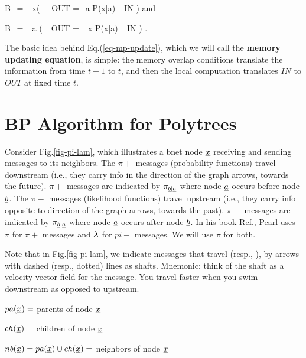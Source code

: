 \beq
B_\pi=
\prod_{x}\indi\left(
_
{OUT}
=\sum_a P(x|a)
_{IN}
\right)
\eeq
and

\beq
B_\pi=
\prod_{a}
\indi\left(
_{OUT}
=
\sum_x P(x|a)
_{IN}
\right)
\;.
\eeq

The basic idea behind Eq.(\ref{eq-mp-update}),
which we will call the
{\bf memory updating equation}, is simple:
the memory overlap conditions translate the information
from time $t-1$ to $t$, and
then the local computation translates
$IN$ to $OUT$ at fixed time $t$.




\section{BP Algorithm for Polytrees}


Consider Fig.\ref{fig-pi-lam},
which illustrates
a bnet node $\rvx$ receiving and sending
messages to its neighbors.
The $\pi+$  messages
(probability functions)
travel downstream (i.e.,
they carry info
in the direction
of the graph arrows, towards the future).
$\pi+$ messages are indicated by
$\pi_{\rvb|\rva}$ where node $\rva$ occurs
before node $\rvb$.
The $\pi-$  messages
(likelihood functions) travel
upstream (i.e., they
carry info opposite to
direction of the graph arrows,
towards the past).
$\pi-$ messages are indicated by
$\pi_{\rvb|\rva}$ where node $\rva$ occurs
after node $\rvb$. In his book Ref.\cite{pearl-1988book}, Pearl uses
$\pi$ for $\pi+$
messages and $\lambda$ for $pi-$ messages.
We will use $\pi$ for both.


Note that in Fig.\ref{fig-pi-lam},
we indicate
messages that travel
(resp., ), by
arrows with dashed (resp., dotted)
 lines as shafts.
Mnemonic: think of the shaft as a
 velocity vector field
for the message.
You travel faster when
you swim downstream as opposed
to upstream.

$pa(\rvx)=$ parents of node $\rvx$

$ch(\rvx)=$ children of node $\rvx$

$nb(\rvx)=pa(\rvx)\cup ch(\rvx)=$
neighbors of node $\rvx$



